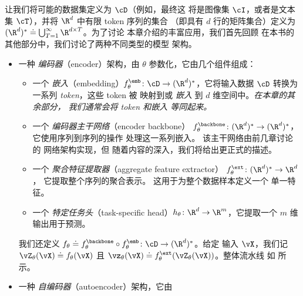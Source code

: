 \documentclass[../../book-main_zh.tex]{subfiles}
\begin{document}
让我们将可能的数据集定义为 \(\cD\)（例如，最终这
    将是图像集 \(\cI\)，或者是文本集
\(\cT\)），并将 \(\R^{d}\) 中有限 token 序列的集合
（即具有 \(d\) 行的矩阵集合）定义为 \((\R^{d})^{*} \doteq
\bigcup_{T = 1}^{\infty}\R^{d \times T}\)。为了讨论
本章介绍的丰富应用，我们首先回顾
在本书的其他部分中，我们讨论了两种不同类型的模型
架构。
\begin{itemize}
    \item 一种 \textit{编码器}（encoder）架构，由
        \(\theta\) 参数化，它由几个组件组成：
        \begin{itemize}
            \item 一个 \textit{嵌入}（embedding）\(f_{\theta}^{\emb} \colon
                \cD \to (\R^{d})^{*}\)，它将输入数据
                \(\cD\) 转换为一系列 \textit{token}，这些 token 被
                映射到或 \textit{嵌入} 到
                \(d\) 维空间中。\textit{在本章的其余部分，
                    我们通常会将 token 和嵌入
                等同起来。}
            \item 一个 \textit{编码器主干网络}（encoder backbone）
                \(f_{\theta}^{\backbone} \colon (\R^{d})^{*} \to
                (\R^{d})^{*}\)，它使用序列到序列的操作
                处理这一系列嵌入。
                该主干网络由前几章讨论的
                网络架构实现，但
                随着内容的深入，我们将给出更正式的描述。
            \item 一个 \textit{聚合特征提取器}（aggregate feature extractor）
                \(f_{\theta}^{\ext} \colon (\R^{d})^{*} \to \R^{d}\)，
                它提取整个序列的聚合表示。
                这用于为整个数据样本定义一个
                单一特征。
            \item 一个 \textit{特定任务头}（task-specific head）\(h_{\theta} \colon
                \R^{d} \to \R^{m}\)，它提取一个
                \(m\) 维输出用于预测。
        \end{itemize}
        我们还定义 \(f_{\theta} \doteq f_{\theta}^{\backbone}
        \circ f_{\theta}^{\emb} \colon \cD \to (\R^{d})^{*}\)。给定
        输入 \(\vX\)，我们记 \(\vZ_{\theta}(\vX) \doteq
        f_{\theta}(\vX)\) 且 \(\vz_{\theta}(\vX) \doteq
        f_{\theta}^{\ext}(\vZ_{\theta}(\vX))\)。整体流水线
        如  所示。
    \item 一种 \textit{自编码器}（autoencoder）架构，它由

\end{itemize}
\end{document}
